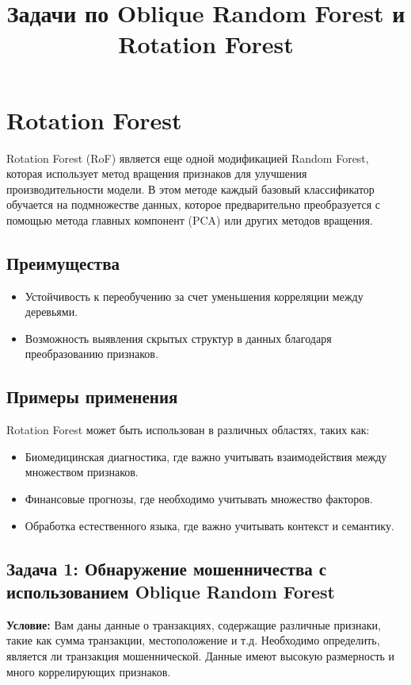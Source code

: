 \section{Rotation Forest}
Rotation Forest (RoF) является еще одной модификацией Random Forest, которая использует метод вращения признаков для улучшения производительности модели. В этом методе каждый базовый классификатор обучается на подмножестве данных, которое предварительно преобразуется с помощью метода главных компонент (PCA) или других методов вращения.

\subsection{Преимущества}
\begin{itemize}
    \item Устойчивость к переобучению за счет уменьшения корреляции между деревьями.
    \item Возможность выявления скрытых структур в данных благодаря преобразованию признаков.
\end{itemize}

\subsection{Примеры применения}
Rotation Forest может быть использован в различных областях, таких как:
\begin{itemize}
    \item Биомедицинская диагностика, где важно учитывать взаимодействия между множеством признаков.
    \item Финансовые прогнозы, где необходимо учитывать множество факторов.
    \item Обработка естественного языка, где важно учитывать контекст и семантику.
\end{itemize}

\title{Задачи по Oblique Random Forest и Rotation Forest}
\author{}
\date{}
\maketitle

\subsection*{Задача 1: Обнаружение мошенничества с использованием Oblique Random Forest}

\textbf{Условие:} 
Вам даны данные о транзакциях, содержащие различные признаки, такие как сумма транзакции, местоположение и т.д. Необходимо определить, является ли транзакция мошеннической. Данные имеют высокую размерность и много коррелирующих признаков.

